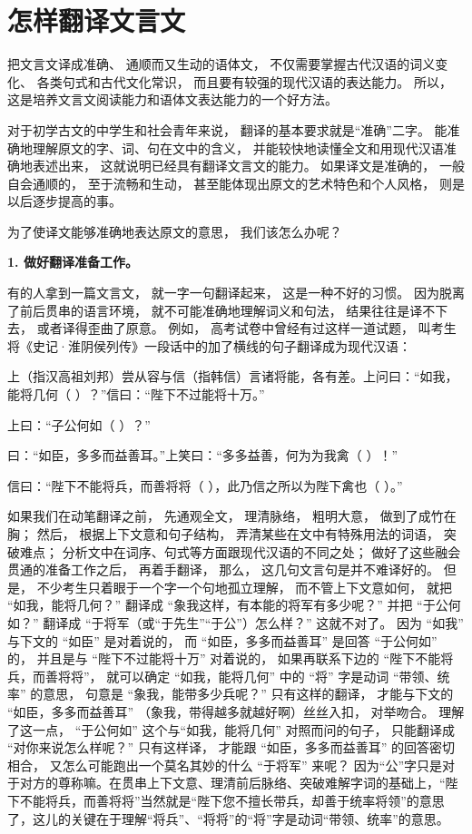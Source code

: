 \section{怎样翻译文言文}

把文言文译成准确、
通顺而又生动的语体文，
不仅需要掌握古代汉语的词义变化、
各类句式和古代文化常识，
而且要有较强的现代汉语的表达能力。
所以，
这是培养文言文阅读能力和语体文表达能力的一个好方法。

对于初学古文的中学生和社会青年来说，
翻译的基本要求就是“准确”二字。
能准确地理解原文的字、词、句在文中的含义，
并能较快地读懂全文和用现代汉语准确地表述出来，
这就说明已经具有翻译文言文的能力。
如果译文是准确的，
一般自会通顺的，
至于流畅和生动，
甚至能体现出原文的艺术特色和个人风格，
则是以后逐步提高的事。

为了使译文能够准确地表达原文的意思，
我们该怎么办呢？

\textbf{1. 做好翻译准备工作。}

有的人拿到一篇文言文，
就一字一句翻译起来，
这是一种不好的习惯。
因为脱离了前后贯串的语言环境，
就不可能准确地理解词义和句法，
结果往往是译不下去，
或者译得歪曲了原意。
例如，
高考试卷中曾经有过这样一道试题，
叫考生将《史记·淮阴侯列传》一段话中的加了横线的句子翻译成为现代汉语：

上（指汉高祖刘邦）尝从容与信（指韩信）言诸将能，各有差。上问曰：“如我，能将几何（ ）？”信曰：“陛下不过能将十万。”

上曰：“子公何如（ ）？”

曰：“如臣，多多而益善耳。”上笑曰：“多多益善，何为为我禽（ ）！”

信曰：“陛下不能将兵，而善将将（ ），此乃信之所以为陛下禽也（ ）。”


如果我们在动笔翻译之前，
先通观全文，
理清脉络，
粗明大意，
做到了成竹在胸；
然后，
根据上下文意和句子结构，
弄清某些在文中有特殊用法的词语，
突破难点；
分析文中在词序、句式等方面跟现代汉语的不同之处；
做好了这些融会贯通的准备工作之后，
再着手翻译，
那么，
这几句文言句是并不难译好的。
但是，
不少考生只着眼于一个字一个句地孤立理解，
而不管上下文意如何，
就把
“如我，能将几何？”
翻译成
“象我这样，有本能的将军有多少呢？”
并把
“于公何如？”
翻译成
“于将军（或“于先生”“于公”）怎么样？”
这就不对了。
因为
“如我”
与下文的
“如臣”
是对着说的，
而
“如臣，多多而益善耳”
是回答
“于公何如”
的，
并且是与
“陛下不过能将十万”
对着说的，
如果再联系下边的
“陛下不能将兵，而善将将”，
就可以确定
“如我，能将几何”
中的
“将”
字是动词
“带领、统率”
的意思，
句意是
“象我，能带多少兵呢？”
只有这样的翻译，
才能与下文的
“如臣，多多而益善耳”
（象我，带得越多就越好啊）丝丝入扣，
对举吻合。
理解了这一点，
“于公何如”
这个与“如我，能将几何”
对照而问的句子，
只能翻译成
“对你来说怎么样呢？”
只有这样译，
才能跟
“如臣，多多而益善耳”
的回答密切相合，
又怎么可能跑出一个莫名其妙的什么
“于将军”
来呢？
因为“公”字只是对于对方的尊称嘛。在贯串上下文意、理清前后脉络、突破难解字词的基础上，“陛下不能将兵，而善将将”当然就是“陛下您不擅长带兵，却善于统率将领”的意思了，这儿的关键在于理解“将兵”、“将将”的“将”字是动词“带领、统率”的意思。

